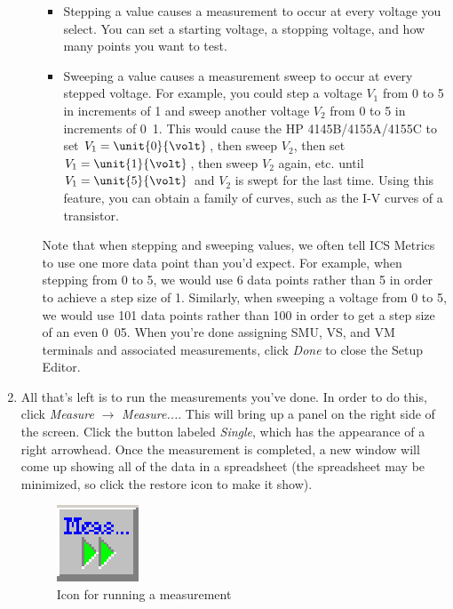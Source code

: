 \documentclass{article}
\begin{document}
\begin{enumerate}
\begin{enumerate}
\begin{itemize}
	\item Stepping a value causes a measurement to occur at every voltage you select. You can set a starting voltage, a stopping voltage, and how many points you want to test.
	\item Sweeping a value causes a measurement sweep to occur at every stepped voltage. For example, you could step a voltage $V_1$ from \unit{0}{\volt} to \unit{5}{\volt} in increments of \unit{1}{\volt} and sweep another voltage $V_2$ from \unit{0}{\volt} to \unit{5}{\volt} in increments of \unit{0.1}{\volt}. This would cause the HP 4145B/4155A/4155C to set $V_1=\unit{0}{\volt}$, then sweep $V_2$, then set $V_1=\unit{1}{\volt}$, then sweep $V_2$ again, etc. until $V_1=\unit{5}{\volt}$ and $V_2$ is swept for the last time. Using this feature, you can obtain a family of curves, such as the I-V curves of a transistor.
      \end{itemize}
      Note that when stepping and sweeping values, we often tell ICS Metrics to use one more data point than you'd expect. For example, when stepping from \unit{0}{\volt} to \unit{5}{\volt}, we would use 6 data points rather than 5 in order to achieve a step size of \unit{1}{\volt}. Similarly, when sweeping a voltage from \unit{0}{\volt} to \unit{5}{\volt}, we would use 101 data points rather than 100 in order to get a step size of an even \unit{0.05}{\volt}.
      When you're done assigning SMU, VS, and VM terminals and associated measurements, click \textit{Done} to close the Setup Editor.
  \end{enumerate}
  \item All that's left is to run the measurements you've done. In order to do this, click \textit{Measure} $\rightarrow$ \textit{Measure...}. This will bring up a panel on the right side of the screen. Click the button labeled \textit{Single}, which has the appearance of a right arrowhead. Once the measurement is completed, a new window will come up showing all of the data in a spreadsheet (the spreadsheet may be minimized, so click the restore icon to make it show).

\begin{figure}[!htb]
  \centering
  \includegraphics{measure.eps}
  \caption{Icon for running a measurement}
  \label{measure}
\end{figure}


\end{enumerate}
\end{document}
